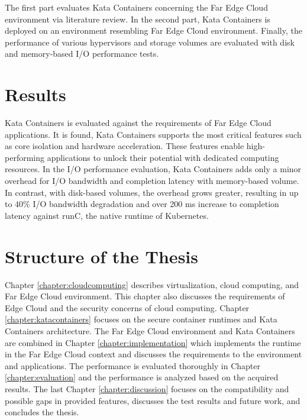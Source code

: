 The first part evaluates Kata Containers concerning the Far Edge Cloud environment via literature review. In the second part, Kata Containers is deployed on an environment resembling Far Edge Cloud environment. Finally, the performance of various hypervisors and storage volumes are evaluated with disk and memory-based I/O performance tests.

\section{Results}
\label{section:intro_results}

Kata Containers is evaluated against the requirements of Far Edge Cloud applications. It is found, Kata Containers supports the most critical features such as core isolation and hardware acceleration. These features enable high-performing applications to unlock their potential with dedicated computing resources. In the I/O performance evaluation, Kata Containers adds only a minor overhead for I/O bandwidth and completion latency with memory-based volume. In contrast, with disk-based volumes, the overhead grows greater, resulting in up to 40\% I/O bandwidth degradation and over 200 ms increase to completion latency against runC, the native runtime of Kubernetes.

\section{Structure of the Thesis}
\label{section:intro_structure}

Chapter \ref{chapter:cloudcomputing} describes virtualization, cloud computing, and Far Edge Cloud environment. This chapter also discusses the requirements of Edge Cloud and the security concerns of cloud computing. Chapter \ref{chapter:katacontainers} focuses on the secure container runtimes and Kata Containers architecture. The Far Edge Cloud environment and Kata Containers are combined in Chapter \ref{chapter:implementation} which implements the runtime in the Far Edge Cloud context and discusses the requirements to the environment and applications. The performance is evaluated thoroughly in Chapter \ref{chapter:evaluation} and the performance is analyzed based on the acquired results. The last Chapter \ref{chapter:discussion} focuses on the compatibility and possible gaps in provided features, discusses the test results and future work, and concludes the thesis.